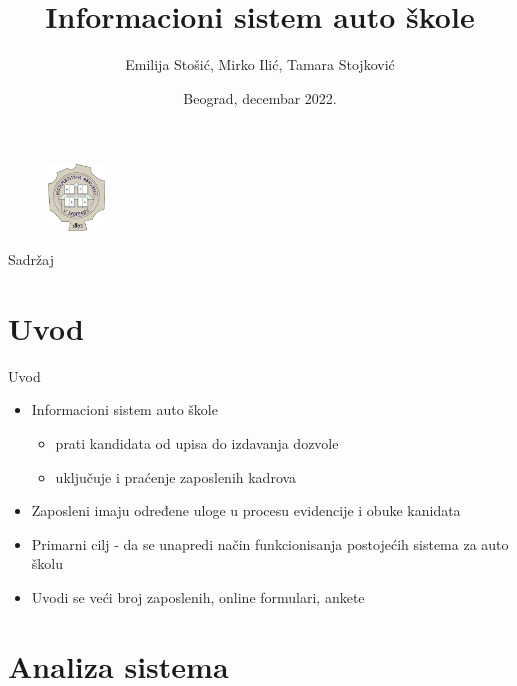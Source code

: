 \documentclass[compress, containsverbatim,mathserif, xcolor=dvipsnames, unicode]{beamer}
\title{Informacioni sistem auto škole}
\author{Emilija Stošić, Mirko Ilić, Tamara Stojković}
\institute{Informacioni sistemi \\ Matematički fakultet \\ Univerzitet u Beogradu}
\date{
	\footnotesize{Beograd, decembar 2022.}	
}
\begin{document}
\begin{frame}
\titlepage

\begin{figure}[h!]
    \centering
    \begin{flushleft}
    \includegraphics[width=15mm]{logo.png}
    \end{flushleft}
\end{figure}
\end{frame}

\begin{frame}{Sadržaj}
\tableofcontents
\end{frame}

\section{Uvod}
\begin{frame}{Uvod}
\vspace{\baselineskip}
\begin{itemize}
	\item Informacioni sistem auto škole 
    \begin{itemize}
        \item prati kandidata od upisa do izdavanja dozvole
        \item uključuje i  praćenje zaposlenih kadrova
    \end{itemize}
    \item Zaposleni imaju određene uloge u procesu evidencije i obuke kanidata
    \item Primarni cilj - da se unapredi način funkcionisanja postojećih sistema za auto školu
    \item Uvodi se veći broj zaposlenih, online formulari, ankete

\end{itemize}
\end{frame}

\section{Analiza sistema}
\end{document}
